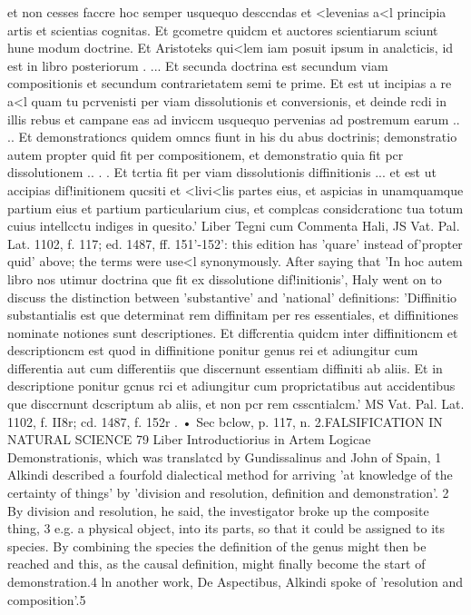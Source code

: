 et non cesses faccre hoc semper usquequo desccndas et <levenias a<l principia
artis et scientias cognitas. Et gcometre quidcm et auctores scientiarum sciunt hune
modum doctrine. Et Aristoteks qui<lem iam posuit ipsum in analcticis, id est in libro
posteriorum . ... Et secunda doctrina est secundum viam compositionis et secundum
contrarietatem semi te prime. Et est ut incipias a re a<l quam tu pcrvenisti per viam dissolutionis
et conversionis, et deinde rcdi in illis rebus et campane eas ad inviccm usquequo
pervenias ad postremum earum .. .. Et demonstrationcs quidem omncs fiunt in his
du abus doctrinis; demonstratio autem propter quid fit per compositionem, et demonstratio
quia fit pcr dissolutionem .. . . Et tcrtia fit per viam dissolutionis diffinitionis ... et
est ut accipias dif!initionem qucsiti et <livi<lis partes eius, et aspicias in unamquamque
partium eius et partium particularium cius, et complcas considcrationc tua totum cuius
intellcctu indiges in quesito.' Liber Tegni cum Commenta Hali, J\1S Vat. Pal. Lat. 1102,
f. 117; ed. 1487, ff. 151'-152': this edition has 'quare' instead of'propter quid' above;
the terms were use<l synonymously. After saying that 'In hoc autem libro nos utimur
doctrina que fit ex dissolutione dif!initionis', Haly went on to discuss the distinction between
'substantive' and 'national' definitions: 'Diffinitio substantialis est que determinat
rem diffinitam per res essentiales, et diffinitiones nominate notiones sunt descriptiones.
Et diffcrentia quidcm inter diffinitioncm et descriptioncm est quod in diffinitione ponitur
genus rei et adiungitur cum differentia aut cum differentiis que discernunt essentiam
diffiniti ab aliis. Et in descriptione ponitur gcnus rci et adiungitur cum proprictatibus aut
accidentibus que disccrnunt dcscriptum ab aliis, et non pcr rem csscntialcm.' MS Vat.
Pal. Lat. 1102, f. II8r; cd. 1487, f. 152r
.
• Sec bclow, p. 117, n. 2.FALSIFICATION IN NATURAL SCIENCE 79
Liber Introductiorius in Artem Logicae Demonstrationis, which was
translatcd by Gundissalinus and John of Spain, 1 Alkindi described
a fourfold dialectical method for arriving 'at knowledge of the
certainty of things' by 'division and resolution, definition and demonstration'.
2 By division and resolution, he said, the investigator
broke up the composite thing, 3 e.g. a physical object, into its parts, so
that it could be assigned to its species. By combining the species the
definition of the genus might then be reached and this, as the causal
definition, might finally become the start of demonstration.4 ln
another work, De Aspectibus, Alkindi spoke of 'resolution and composition'.5
